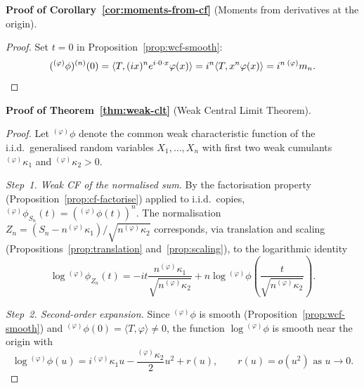 \documentclass[12pt]{article}
\theoremstyle{definition}
\begin{document}
\medskip
\noindent\textbf{Proof of Corollary~\ref{cor:moments-from-cf}}
(Moments from derivatives at the origin).

\begin{proof}
Set $t=0$ in Proposition~\ref{prop:wcf-smooth}:
\[
({}^{(\varphi)}\phi)^{(n)}(0)
= \langle T,(ix)^n e^{i\cdot 0\cdot x}\varphi(x)\rangle
= i^n\langle T,x^n\varphi(x)\rangle
= i^n\,{}^{(\varphi)}m_n. \qedhere
\]
\end{proof}

\medskip
\noindent\textbf{Proof of Theorem~\ref{thm:weak-clt}}
(Weak Central Limit Theorem).

\begin{proof}
Let ${}^{(\varphi)}\phi$ denote the common weak characteristic function
of the i.i.d.\ generalised random variables $X_1,\ldots,X_n$ with
first two weak cumulants ${}^{(\varphi)}\kappa_1$ and
${}^{(\varphi)}\kappa_2 > 0$.

\emph{Step~1.  Weak CF of the normalised sum.}
By the factorisation property (Proposition~\ref{prop:cf-factorise})
applied to i.i.d.\ copies,
${}^{(\varphi)}\phi_{S_n}(t) = ({}^{(\varphi)}\phi(t))^n$.  The
normalisation $Z_n = (S_n - n{}^{(\varphi)}\kappa_1)/\sqrt{n{}^{(\varphi)}\kappa_2}$
corresponds, via translation and scaling
(Propositions~\ref{prop:translation} and~\ref{prop:scaling}), to the
logarithmic identity
\[
\log{}^{(\varphi)}\phi_{Z_n}(t)
= -it\frac{n{}^{(\varphi)}\kappa_1}{\sqrt{n{}^{(\varphi)}\kappa_2}}
+ n\log{}^{(\varphi)}\phi\!\left(\frac{t}{\sqrt{n{}^{(\varphi)}\kappa_2}}\right).
\]

\emph{Step~2.  Second-order expansion.}
Since ${}^{(\varphi)}\phi$ is smooth (Proposition~\ref{prop:wcf-smooth})
and ${}^{(\varphi)}\phi(0)=\langle T,\varphi\rangle\neq 0$, the function
$\log{}^{(\varphi)}\phi$ is smooth near the origin with
\[
\log{}^{(\varphi)}\phi(u)
= i{}^{(\varphi)}\kappa_1 u - \frac{{}^{(\varphi)}\kappa_2}{2}u^2 + r(u),
\qquad r(u)=o(u^2)\text{ as }u\to 0.
\]


\end{proof}
\end{document}
